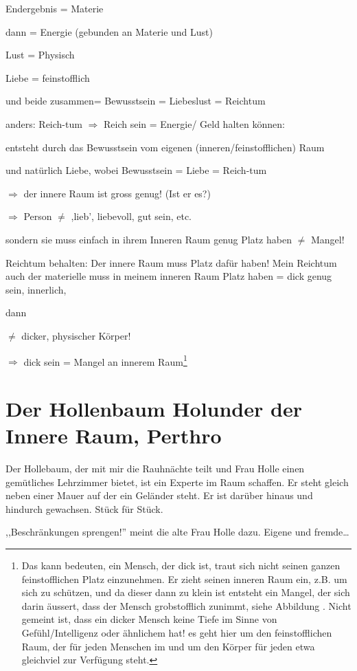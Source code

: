 \documentclass[11pt,titlepage,a5paper]{book}
\begin{document}
Endergebnis = Materie

dann = Energie (gebunden an Materie und Lust)

Lust = Physisch

Liebe = feinstofflich

und beide zusammen= Bewusstsein = Liebeslust = Reichtum

anders: Reich-tum $\Rightarrow$ Reich sein = Energie/ Geld halten können:

entsteht durch das Bewusstsein vom eigenen (inneren/feinstofflichen) Raum

und natürlich Liebe, wobei Bewusstsein = Liebe = Reich-tum

$\Rightarrow$ der innere Raum ist gross genug! (Ist er es?)

$\Rightarrow$ Person $\neq$ ,lieb', liebevoll, gut sein, etc. 

sondern sie muss einfach in ihrem Inneren Raum genug Platz haben $\neq$ Mangel!

Reichtum behalten: Der innere Raum muss Platz dafür haben! Mein Reichtum auch der materielle muss in meinem inneren Raum Platz haben = dick genug sein, innerlich,

dann

$\neq$ dicker, physischer Körper!

$\Rightarrow$ dick sein = Mangel an innerem Raum\footnote{Das kann bedeuten, ein Mensch, der dick ist, traut sich nicht seinen ganzen feinstofflichen Platz einzunehmen. Er zieht seinen inneren Raum ein, z.B. um sich zu schützen, und da dieser dann zu klein ist entsteht ein Mangel, der sich darin äussert, dass der Mensch grobstofflich zunimmt, siehe Abbildung . Nicht gemeint ist, dass ein dicker Mensch keine Tiefe im Sinne von Gefühl/Intelligenz oder ähnlichem hat! es geht hier um den feinstofflichen Raum, der für jeden Menschen im und um den Körper für jeden etwa gleichviel zur Verfügung steht.}

\section{Der Hollenbaum Holunder der Innere Raum, Perthro }

Der Hollebaum, der mit mir die Rauhnächte teilt und Frau Holle einen gemütliches Lehrzimmer bietet, ist ein Experte im Raum schaffen. Er steht gleich neben einer Mauer auf der ein Geländer steht. Er ist darüber hinaus und hindurch gewachsen. Stück für Stück.

,,Beschränkungen sprengen!'' meint die alte Frau Holle dazu. Eigene und fremde\dots
\end{document}
